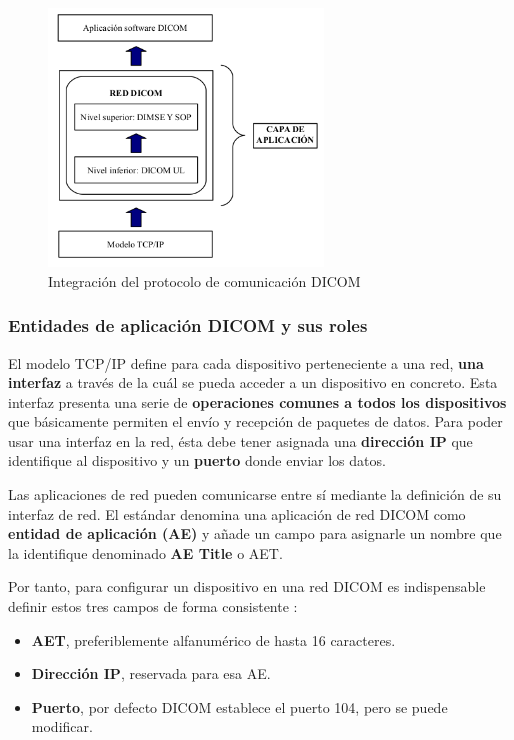 \begin{figure}[!h]
\begin{center}
\includegraphics[width=0.65\textwidth]{images/integracionDICOM.png}
\caption{Integración del protocolo de comunicación DICOM}
\label{fig:integracionDICOM}
\end{center}
\end{figure}

\subsubsection{Entidades de aplicación DICOM y sus roles}
El modelo TCP/IP define para cada dispositivo perteneciente a una red, \textbf{una interfaz} a través de la cuál se pueda acceder a un dispositivo en concreto. Esta interfaz presenta una serie de \textbf{operaciones comunes a todos los dispositivos} que básicamente permiten el envío y recepción de paquetes de datos. Para poder usar una interfaz en la red, ésta debe tener asignada una \textbf{dirección IP} que identifique al dispositivo y un \textbf{puerto} donde enviar los datos.

Las aplicaciones de red pueden comunicarse entre sí mediante la definición de su interfaz de red. El estándar denomina una aplicación de red DICOM como \textbf{entidad de aplicación (AE)} y añade un campo para asignarle un nombre que la identifique denominado \textbf{AE Title} o AET.

Por tanto, para configurar un dispositivo en una red DICOM es indispensable definir estos tres campos de forma consistente \cite{13}:
\begin{itemize}
\item \textbf{AET}, preferiblemente alfanumérico de hasta 16 caracteres.
\item \textbf{Dirección IP}, reservada para esa AE.
\item \textbf{Puerto}, por defecto DICOM establece el puerto 104, pero se puede modificar.
\end{itemize}

